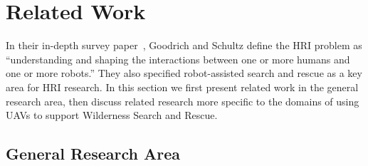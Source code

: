 \section{Related Work}
\label{related}

In their in-depth survey paper~\cite{Goodrich2007HRISurvey}, Goodrich and Schultz define the HRI problem as ``understanding and shaping the interactions between one or more humans and one or more robots.'' They also specified robot-assisted search and rescue as a key area for HRI research. In this section we first present related work in the general research area, then discuss related research more specific to the domains of using UAVs to support Wilderness Search and Rescue.

\subsection{General Research Area}


